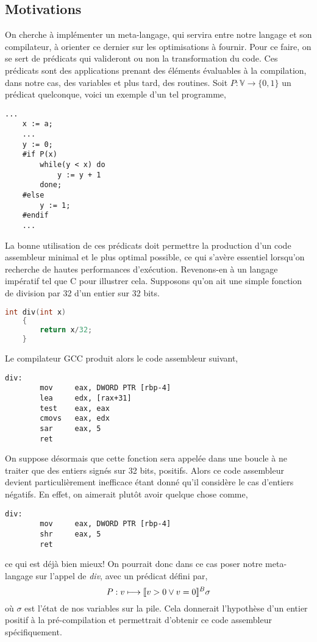 \documentclass[a4paper, 12pt]{article}
\begin{document}
\subsection{Motivations}
On cherche à implémenter un meta-langage, qui servira entre notre langage et son compilateur, à orienter
ce dernier sur les optimisations à fournir. Pour ce faire, on se sert de prédicats qui valideront ou non la
transformation du code. Ces prédicats sont des applications prenant des éléments évaluables à la compilation, 
dans notre cas, des variables et plus tard, des routines.
Soit $P : \mathbb{V} \longrightarrow \{0, 1\}$ un prédicat quelconque, voici un exemple d'un tel programme,
\begin{lstlisting}[tabsize=2]
	...
	x := a;
	...
	y := 0;
	#if P(x)
		while(y < x) do
			y := y + 1
		done;
	#else
		y := 1;
	#endif
	...
\end{lstlisting}
La bonne utilisation de ces prédicats doit permettre la production d'un code assembleur minimal et le plus
optimal possible, ce qui s'avère essentiel lorsqu'on recherche de hautes performances d'exécution.
Revenons-en à un langage impératif tel que C pour illustrer cela. Supposons qu'on ait une simple fonction de division 
par 32 d'un entier sur 32 bits.
\begin{lstlisting}[tabsize=2, language=c]
	int div(int x)
	{
		return x/32;
	}
\end{lstlisting}
Le compilateur GCC produit alors le code assembleur suivant,
\begin{lstlisting}[tabsize=2]
	div:
		mov     eax, DWORD PTR [rbp-4]
		lea     edx, [rax+31]
		test    eax, eax
		cmovs   eax, edx
		sar     eax, 5
		ret
\end{lstlisting}
On suppose désormais que cette fonction sera appelée dans une boucle à ne traiter que des entiers signés sur 32 bits, positifs.
Alors ce code assembleur devient particulièrement inefficace étant donné qu'il considère le cas d'entiers
négatifs. En effet, on aimerait plutôt avoir quelque chose comme,
\begin{lstlisting}[tabsize=2]
	div:
		mov     eax, DWORD PTR [rbp-4]
		shr     eax, 5
		ret
\end{lstlisting}
ce qui est déjà bien mieux! On pourrait donc dans ce cas poser notre meta-langage sur l'appel de \textit{div}, avec un prédicat
défini par,
\[P : v \longmapsto [\![{v > 0 \vee v = 0}]\!]^{B}\sigma\]
où $\sigma$ est l'état de nos variables sur la pile. Cela donnerait l'hypothèse d'un entier positif à la pré-compilation
et permettrait d'obtenir ce code assembleur spécifiquement.
\end{document}
